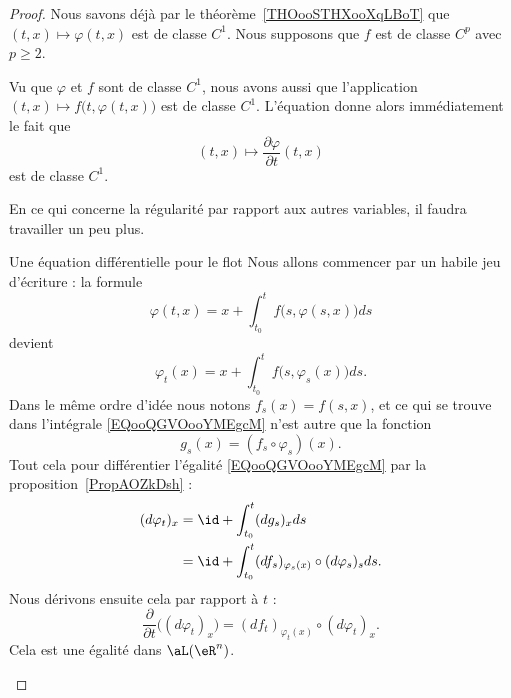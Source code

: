 \begin{proof}
	Nous savons déjà par le théorème~\ref{THOooSTHXooXqLBoT} que \( (t,x)\mapsto \varphi(t,x)\) est de classe \( C^1\). Nous supposons que \( f\) est de classe \( C^p\) avec \( p\geq 2\).

	Vu que \( \varphi\) et \( f\) sont de classe \( C^1\), nous avons aussi que l'application \( (t,x)\mapsto f\big( t,\varphi(t,x) \big)\) est de classe \( C^1\). L'équation donne alors immédiatement le fait que
	\begin{equation}
		(t,x)\mapsto\frac{ \partial \varphi }{ \partial t }(t,x)
	\end{equation}
	est de classe \( C^1\).

	En ce qui concerne la régularité par rapport aux autres variables, il faudra travailler un peu plus.

	\begin{subproof}
		\item[Une équation différentielle pour le flot]
		Nous allons commencer par un habile jeu d'écriture : la formule
		\begin{equation}
			\varphi(t,x)=x+\int_{t_0}^tf\big( s,\varphi(s,x) \big)ds
		\end{equation}
		devient
		\begin{equation}        \label{EQooQGVOooYMEgcM}
			\varphi_t(x)=x+\int_{t_0}^tf\big( s,\varphi_s(x) \big)ds.
		\end{equation}
		Dans le même ordre d'idée nous notons \( f_s(x)=f(s,x)\), et ce qui se trouve dans l'intégrale \eqref{EQooQGVOooYMEgcM} n'est autre que la fonction
		\begin{equation}
			g_s(x)=(f_s\circ\varphi_s)(x).
		\end{equation}
		Tout cela pour différentier l'égalité \eqref{EQooQGVOooYMEgcM} par la proposition~\ref{PropAOZkDsh} :
		\begin{subequations}
			\begin{align}
				(d\varphi_t)_x & =\id+\int_{t_0}^t(dg_s)_xds                                  \\
				               & =\id+\int_{t_0}^t(df_s)_{\varphi_s(x)}\circ(d\varphi_s)_sds.
			\end{align}
		\end{subequations}
		Nous dérivons ensuite cela par rapport à \( t\) :
		\begin{equation}        \label{EQooBETGooXKWRxX}
			\frac{ \partial  }{ \partial t }\Big( (d\varphi_t)_x \Big)=(df_t)_{\varphi_t(x)}\circ(d\varphi_t)_x.
		\end{equation}
		Cela est une égalité dans \( \aL(\eR^n)\).


\end{subproof}
\end{proof}
